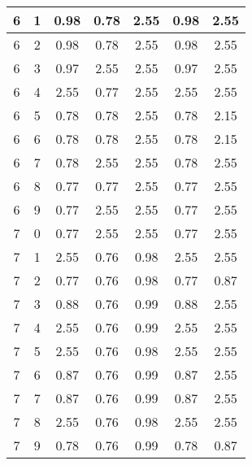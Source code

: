 \begin{longtable}{|c|c||c||c|c||c|c|}
	6 & 1 & 0.98 & 0.78 & 2.55 & 0.98 & 2.55 \\ \hline
	6 & 2 & 0.98 & 0.78 & 2.55 & 0.98 & 2.55 \\ \hline
	6 & 3 & 0.97 & 2.55 & 2.55 & 0.97 & 2.55 \\ \hline
	6 & 4 & 2.55 & 0.77 & 2.55 & 2.55 & 2.55 \\ \hline
	6 & 5 & 0.78 & 0.78 & 2.55 & 0.78 & 2.15 \\ \hline
	6 & 6 & 0.78 & 0.78 & 2.55 & 0.78 & 2.15 \\ \hline
	6 & 7 & 0.78 & 2.55 & 2.55 & 0.78 & 2.55 \\ \hline
	6 & 8 & 0.77 & 0.77 & 2.55 & 0.77 & 2.55 \\ \hline
	6 & 9 & 0.77 & 2.55 & 2.55 & 0.77 & 2.55 \\ \hline
	7 & 0 & 0.77 & 2.55 & 2.55 & 0.77 & 2.55 \\ \hline
	7 & 1 & 2.55 & 0.76 & 0.98 & 2.55 & 2.55 \\ \hline
	7 & 2 & 0.77 & 0.76 & 0.98 & 0.77 & 0.87 \\ \hline
	7 & 3 & 0.88 & 0.76 & 0.99 & 0.88 & 2.55 \\ \hline
	7 & 4 & 2.55 & 0.76 & 0.99 & 2.55 & 2.55 \\ \hline
	7 & 5 & 2.55 & 0.76 & 0.98 & 2.55 & 2.55 \\ \hline
	7 & 6 & 0.87 & 0.76 & 0.99 & 0.87 & 2.55 \\ \hline
	7 & 7 & 0.87 & 0.76 & 0.99 & 0.87 & 2.55 \\ \hline
	7 & 8 & 2.55 & 0.76 & 0.98 & 2.55 & 2.55 \\ \hline
	7 & 9 & 0.78 & 0.76 & 0.99 & 0.78 & 0.87 \\ \hline
\end{longtable}
\clearpage{}
